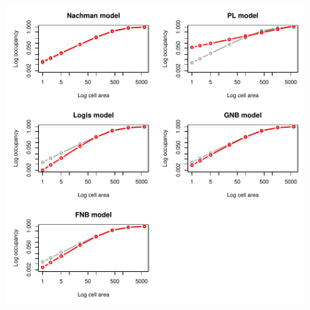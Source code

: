 \documentclass{article}[12pt, a4paper]
\begin{document}
\begin{figure}[!ht]
\centering
\includegraphics[width=13cm]{Downscaling-downscale}
\end{figure}
\end{document}
